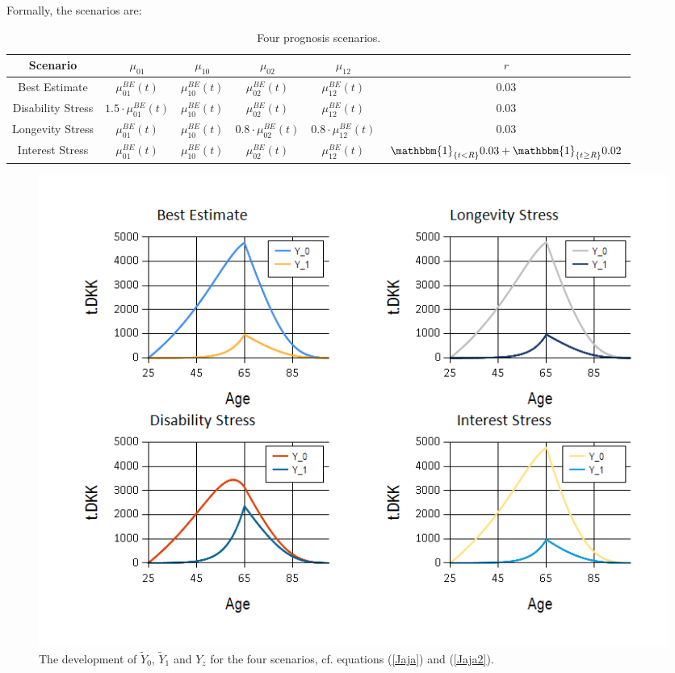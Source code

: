 \documentclass{article}
\newcommand{\1}[1]{\mathbbm{1}_{\left\lbrace #1 \right\rbrace}}
\theoremstyle{break}
\theoremstyle{remark}
\numberwithin{equation}{section}
\begin{document}
Formally, the scenarios are:

\begin{table}[H]
	\caption{Four prognosis scenarios.}
	\begin{center}
	\begin{tabular}{ |c|c|c|c|c|c| }
		\hline
		Scenario & $\mu_{01}$ & $\mu_{10}$ & $\mu_{02}$ & $\mu_{12}$ & $r$ \\
		\hline
		Best Estimate & $\mu_{01}^{BE}(t)$ & $\mu_{10}^{BE}(t)$ & $\mu_{02}^{BE}(t)$ &$\mu_{12}^{BE}(t)$ & 0.03 \\
		Disability Stress & $1.5 \cdot \mu_ {01}^{BE}(t)$ & $\mu_{10}^{BE}(t)$ & $\mu_{02}^{BE}(t)$ & $\mu_{12}^{BE}(t)$ & 0.03 \\
		Longevity Stress & $\mu_{01}^{BE}(t)$ & $\mu_{10}^{BE}(t)$ & $0.8 \cdot \mu_{02}^{BE}(t)$ & $0.8 \cdot \mu_{12}^{BE}(t)$ & 0.03 \\
		Interest Stress & $\mu_{01}^{BE}(t)$ & $\mu_{10}^{BE}(t)$ & $\mu_{02}^{BE}(t)$ & $\mu_{12}^{BE}(t)$ & $\1{t < R} 0.03 + \1{t \geq R} 0.02$ \\
		\hline
	\end{tabular}
\newline
\end{center}
\end{table}

\begin{figure}[H]
	\centering
	\caption{The development of $\tilde{Y}_0$, $\tilde{Y}_1$ and $Y_z$ for the four scenarios, cf. equations (\ref{Jaja}) and (\ref{Jaja2}).}
	\includegraphics[width=\textwidth]{Reserves}
\end{figure}
\end{document}

